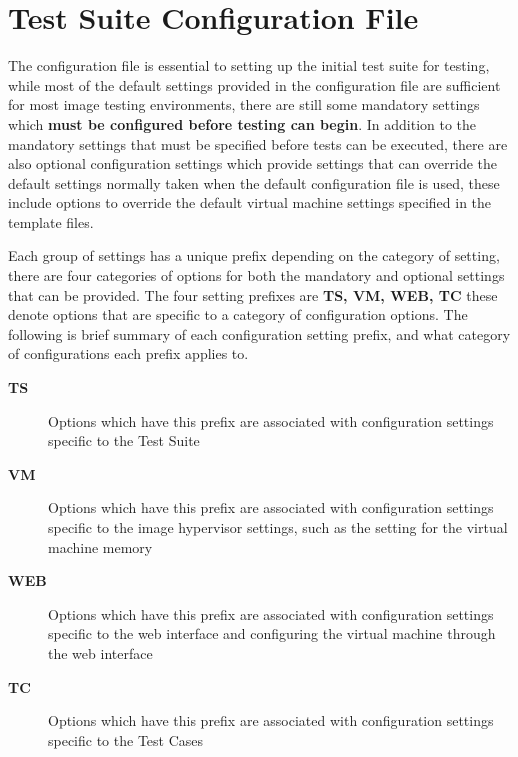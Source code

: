 \chapter{Test Suite Configuration File}
\label{sct:configfile}

The configuration file is essential to setting up the initial \cernvm test suite for testing, while most of the default 
settings provided in the configuration file are sufficient for most \cernvm image testing environments, there are still
some mandatory settings which {\bf must be configured before testing can begin}. In addition to the mandatory settings
that must be specified before tests can be executed, there are also optional configuration settings which provide settings
that can override the default settings normally taken when the default configuration file is used, these include options
to override the default virtual machine settings specified in the template files.

Each group of settings has a unique prefix depending on the category of setting, there are four categories of options
for both the mandatory and optional settings that can be provided. The four setting prefixes are {\bf TS, VM, WEB, TC}
these denote options that are specific to a category of configuration options. The following is brief summary of each
configuration setting prefix, and what category of configurations each prefix applies to.

\begin{description}
\item[{\bf TS}]		Options which have this prefix are associated with configuration settings specific to the
					\cernvmreleasetesting Test Suite

\item[{\bf VM}]		Options which have this prefix are associated with configuration settings specific to the
					\cernvm image hypervisor settings, such as the setting for the virtual machine memory
					
\item[{\bf WEB}]	Options which have this prefix are associated with configuration settings specific to the
					\cernvm web interface and configuring the virtual machine through the web interface
					
\item[{\bf TC}]		Options which have this prefix are associated with configuration settings specific to the
					\cernvm Test Cases
\end{description}


